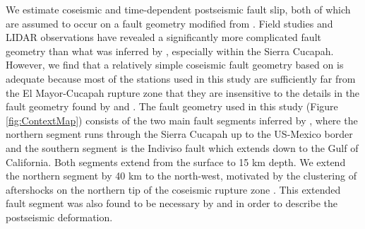 \documentclass[1p]{elsarticle}
\begin{document}
We estimate coseismic and time-dependent postseismic fault slip, both of which are assumed to occur on a fault geometry modified from \citet{Wei2011}.  Field studies \citep{Fletcher2014} and LIDAR observations \citep{Oskin2012} have revealed a significantly more complicated fault geometry than what was inferred by \citet{Wei2011}, especially within the Sierra Cucapah.  However, we find that a relatively simple coseismic fault geometry based on \citep{Wei2011} is adequate because most of the stations used in this study are sufficiently far from the El Mayor-Cucapah rupture zone that they are insensitive to the details in the fault geometry found by \citet{Fletcher2014} and \citet{Oskin2012}.  The fault geometry used in this study (Figure \ref{fig:ContextMap}) consists of the two main fault segments inferred by \citet{Wei2011}, where the northern segment runs through the Sierra Cucapah up to the US-Mexico border and the southern segment is the Indiviso fault which extends down to the Gulf of California. Both segments extend from the surface to 15 km depth.  We extend the northern segment by 40 km to the north-west, motivated by the clustering of aftershocks on the northern tip of the coseismic rupture zone \citep{Hauksson2011,Kroll2013}.  This extended fault segment was also found to be necessary by \citet{Rollins2015} and \citet{Pollitz2012} in order to describe the postseismic deformation. 

\end{document}
